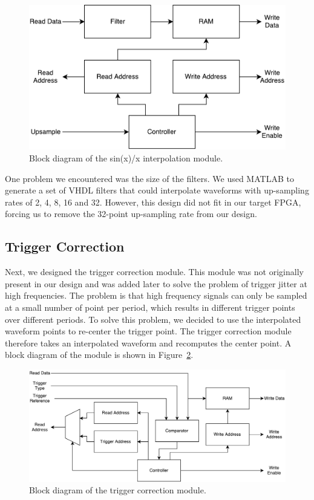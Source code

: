 \documentclass[journal]{IEEEtran}
\begin{document}
\begin{figure}[!htb]
  \centering
  \includegraphics[width=\columnwidth]{diagrams/sinc_interpolation.pdf}
  \caption{Block diagram of the sin(x)/x interpolation module.}
  \label{fig:sinc_interpol}
\end{figure}

One problem we encountered was the size of the filters. We used MATLAB to generate a set of VHDL filters that could interpolate waveforms with up-sampling rates of 2, 4, 8, 16 and 32. However, this design did not fit in our target FPGA, forcing us to remove the 32-point up-sampling rate from our design.

\subsection{Trigger Correction}

Next, we designed the trigger correction module. This module was not originally present in our design and was added later to solve the problem of trigger jitter at high frequencies. The problem is that high frequency signals can only be sampled at a small number of point per period, which results in different trigger points over different periods. To solve this problem, we decided to use the interpolated waveform points to re-center the trigger point. The trigger correction module therefore takes an interpolated waveform and recomputes the center point. A block diagram of the module is shown in Figure~\ref{fig:trig_correction}.

\begin{figure}[!htb]
  \centering
  \includegraphics[width=\columnwidth]{diagrams/trigger_correction.pdf}
  \caption{Block diagram of the trigger correction module.}
  \label{fig:trig_correction}
\end{figure}
\end{document}
